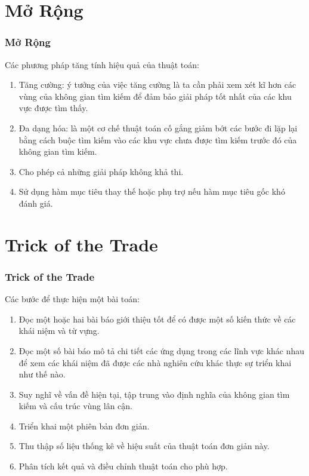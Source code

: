 \documentclass[12pt]{beamer}
\begin{document}
	\section{Mở Rộng}
	\begin{frame}
		\frametitle{Mở Rộng}
		Các phương pháp tăng tính hiệu quả của thuật toán:\\
		\begin{enumerate}
			\item Tăng cường: ý tưởng của việc tăng cường là ta cần phải xem xét kĩ hơn các vùng của không gian tìm kiếm để đảm bảo giải pháp tốt nhất của các khu vực được tìm thấy.
			\item Đa dạng hóa: là một cơ chế thuật toán cố gắng giảm bớt các bước đi lặp lại bằng cách buộc tìm kiếm vào các khu vực chưa được tìm kiếm trước đó của không gian tìm kiếm.
			\item Cho phép cả những giải pháp không khả thi.
			\item Sử dụng hàm mục tiêu thay thế hoặc phụ trợ nếu hàm mục tiêu gốc khó đánh giá.
		\end{enumerate}
	\end{frame}
	
	\section{Trick of the Trade}
	\begin{frame}
		\frametitle{Trick of the Trade}
		Các bước để thực hiện một bài toán:\\
		\begin{enumerate}
			\item Đọc một hoặc hai bài báo giới thiệu tốt để có được một số kiến thức về các khái niệm và từ vựng.
			\item Đọc một số bài báo mô tả chi tiết các ứng dụng trong các lĩnh vực khác nhau để xem các khái niệm đã được các nhà nghiên cứu khác thực sự triển khai như thế nào.
			\item Suy nghĩ về vấn đề hiện tại, tập trung vào định nghĩa của không gian tìm kiếm và cấu trúc vùng lân cận.
			\item Triển khai một phiên bản đơn giản.
			\item Thu thập số liệu thống kê về hiệu suất của thuật toán đơn giản này.
			\item Phân tích kết quả và điều chỉnh thuật toán cho phù hợp.
		\end{enumerate}
	\end{frame}
\end{document}
